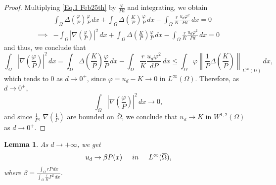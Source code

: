 \documentclass[11pt]{article}
\newcommand{\norm}[1]{\left\|#1\right\|}
\newcommand{\parentheses}[1]{\left(#1\right)}
\newcommand{\module}[1]{\left|#1\right|}
\newtheorem{lemma}[statement]{Lemma}
\theoremstyle{definition}
\theoremstyle{remark}
\begin{document}
\begin{proof}
    Multiplying \eqref{Eq.1 Feb25th} by $\frac{\varphi}{Pd}$ and integrating, we obtain 
    \begin{align*}
        &\int_\Omega\Delta\parentheses{\frac{\varphi}{P}}\frac{\varphi}{P}\,dx+\int_\Omega\Delta\parentheses{\frac{K}{P}}\frac{\varphi}{P}\,dx - \int_\Omega \frac{r}{K}\frac{u_d\varphi^2}{Pd}\,dx=0\\
        \implies& -\int_\Omega\module{\nabla\parentheses{\frac{\varphi}{P}}}^2\,dx+\int_\Omega\Delta\parentheses{\frac{K}{P}}\frac{\varphi}{P}\,dx - \int_\Omega \frac{r}{K}\frac{u_d\varphi^2}{Pd}\,dx=0
    \end{align*}
    and thus, we conclude that
    \begin{equation*}
        \int_\Omega\module{\nabla\parentheses{\frac{\varphi}{P}}}^2\,dx=\int_\Omega\Delta\parentheses{\frac{K}{P}}\frac{\varphi}{P}\,dx-\int_\Omega\frac{r}{K}\frac{u_d\varphi^2}{dP}\,dx\leq\int_\Omega \varphi\norm{\frac{1}{P}\Delta\parentheses{\frac{K}{P}}}_{L^\infty(\Omega)}\,dx,
    \end{equation*}
    which tends to 0 as $d\to0^+$, since $\varphi=u_d-K\to0$ in $L^\infty(\Omega)$. Therefore, as $d\to0^+$, 
    \begin{equation*}
        \int_\Omega\module{\nabla\parentheses{\frac{\varphi}{P}}}^2\,dx\to0,
    \end{equation*}
    and since $\frac{1}{P}$, $\nabla\parentheses{\frac{1}{P}}$ are bounded on $\bar\Omega$, we conclude that $u_d\to K$ in $W^{1,2}(\Omega)$ as $d\to0^+$.
\end{proof}


\begin{lemma}\label{Prop 2 DeAngelis}
    As $d\to+\infty$, we get
        \begin{equation*}
            u_d\to \beta P(x)\hspace{0.5cm} in \hspace{0.5cm} L^\infty(\overline{\Omega}),
        \end{equation*}
    where $\displaystyle \beta=\frac{\int_\Omega rP\,dx}{\int_\Omega\frac{r}{K}P^2\,dx}$.

\end{lemma}
\end{document}
